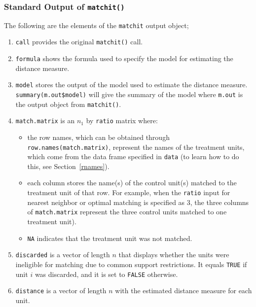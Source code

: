 \documentclass[oneside,letterpaper,titlepage]{article}
\begin{document}
\subsubsection{Standard Output of \texttt{matchit()}}

The following are the elements of the \texttt{matchit} output object;

\begin{enumerate}
  
\item \texttt{call} provides the original {\tt matchit()} call.
  
\item \texttt{formula} shows the formula used to specify the model for
  estimating the distance measure.
  
\item \texttt{model} stores the output of the model used to estimate
  the distance measure.  \texttt{summary(m.out\$model)} will give the
  summary of the model where \texttt{m.out} is the output object from
  \texttt{matchit()}.
  
\item \texttt{match.matrix} is an $n_1$ by \texttt{ratio} matrix
  where:
  \begin{itemize}
  \item the row names, which can be obtained through
    \texttt{row.names(match.matrix)}, represent the names of the
    treatment units, which come from the data frame specified in
    \texttt{data} (to learn how to do this, see Section~\ref{rnames}).
  \item each column stores the name(s) of the control unit(s) matched
    to the treatment unit of that row. For example, when the
    \texttt{ratio} input for nearest neighbor or optimal matching is specified as 3, the three columns of
    \texttt{match.matrix} represent the three control units matched to
    one treatment unit).
  \item \texttt{NA} indicates that the treatment unit was not matched.  
  \end{itemize}
   
\item \texttt{discarded} is a vector of length $n$ that displays
  whether the units were ineligible for matching due to common
  support restrictions.  It equals \texttt{TRUE} if unit $i$ was
  discarded, and it is set to \texttt{FALSE} otherwise.
  
\item \texttt{distance} is a vector of length $n$ with the estimated
  distance measure for each unit.
  

\end{enumerate}
\end{document}
